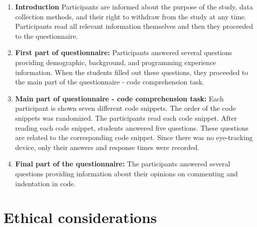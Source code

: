 \begin{enumerate}
    \item \textbf{Introduction} Participants are informed about the purpose of the study, data collection methods, and their right to withdraw from the study at any time. Participants read all relevant information themselves and then they proceeded to the questionnaire.
    
    \item \textbf{First part of questionnaire:}
    Participants answered several questions providing demographic, background, and programming experience information. When the students filled out these questions, they proceeded to the main part of the questionnaire - code comprehension task.

    \item \textbf{Main part of questionnaire - code comprehension task:} Each participant is shown seven different code snippets. The order of the code snippets was randomized. The participants read each code snippet. After reading each code snippet, students answered five questions. These questions are related to the corresponding code snippet. Since there was no eye-tracking device, only their answers and response times were recorded.

    \item \textbf{Final part of the questionnaire:}
    The participants answered several questions providing information about their opinions on commenting and indentation in code.
\end{enumerate}




\section{Ethical considerations}

